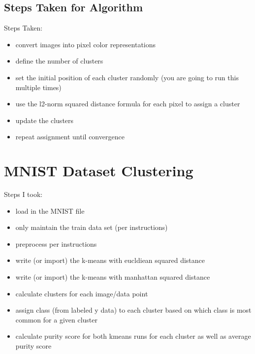 \documentclass{article}
\begin{document}
\subsection*{Steps Taken for Algorithm}
Steps Taken:
\begin{itemize}
\item convert images into pixel color representations
\item define the number of clusters
\item set the initial position of each cluster randomly (you are going to run this multiple times)
\item use the l2-norm squared distance formula for each pixel to assign a cluster
\item update the clusters
\item repeat assignment until convergence
\end{itemize}

\section{MNIST Dataset Clustering}

Steps I took:
\begin{itemize}
\item load in the MNIST file
\item only maintain the train data set (per instructions)
\item preprocess per instructions
\item write (or import) the k-means with eucldiean squared distance
\item write (or import) the k-means with manhattan squared distance
\item calculate clusters for each image/data point
\item assign class (from labeled y data) to each cluster based on which class is most common for a given cluster
\item calculate purity score for both kmeans runs for each cluster as well as average purity score
\end{itemize}
\end{document}
